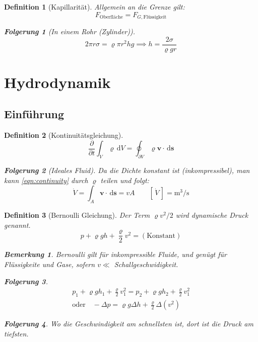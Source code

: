 \documentclass[a4paper, twocolumn]{article}
\numberwithin{equation}{section}
\theoremstyle{hsr-def}
\newtheorem{definition}{Definition}[section]
\theoremstyle{hsr-sub}
\newtheorem{result}{Folgerung}[definition]
\newtheorem{remark}{Bemerkung}[definition]
\newcommand{\dd}[1]{\ensuremath{\mathrm{d}#1}}
\newcommand{\di}[1]{\,\dd{#1}}
\newcommand{\pderiv}[2]{\ensuremath{\frac{\partial #1}{\partial #2}}}
\renewcommand{\vec}[1]{\ensuremath{\mathbf{#1}}}
\newcommand{\unitsof}[1]{\ensuremath{\left[\,#1\,\right]}}
\begin{document}
\begin{definition}[Kapillarit\"at]
Allgemein an die Grenze gilt:
\[
    F_\text{Oberfl\"ache} = F_{G,\text{Fl\"ussigkeit}}
\]
\begin{result}[In einem Rohr (Zylinder)]
\[
    2\pi r\sigma = \varrho\pi r^2 hg \implies  h = \frac{2\sigma}{\varrho g r}
\]
\end{result}
\end{definition}

\section{Hydrodynamik}
\subsection{Einf\"uhrung}
\begin{definition}[Kontinuit\"atsgleichung]
\begin{equation} \label{eqn:continuity}
    \pderiv{}{t}\int_V \varrho \di{V} 
    = \oint_{\partial V} \varrho \vec{v}\cdot\di{\vec{s}}
\end{equation}

\begin{result}[Ideales Fluid]
Da die Dichte konstant ist (inkompressibel), man kann \eqref{eqn:continuity} durch \(\varrho\) teilen und folgt:
\[
    \dot{V} = \int_A \vec{v}\cdot\di{\vec{s}} = vA
    \qquad
    \unitsof{\dot{V}} = \si{\cubic\metre\per\second}
\]
\end{result}

\end{definition}

\begin{definition}[Bernoulli Gleichung]
Der Term \(\varrho v^2 / 2\) wird \emph{dynamische Druck} genannt.
\[
    p + \varrho g h + \frac{\varrho}{2} v^2 = (\text{Konstant})
\]

\begin{remark}
Bernoulli gilt f\"ur inkompressible Fluide, und gen\"ugt f\"ur Fl\"ussigkeite und Gase, sofern \(v \ll \) Schallgeschwidigkeit.
\end{remark}

\begin{result}
\begin{gather*}
    p_1 + \varrho g h_1 + \frac{\varrho}{2} v_1^2
    =
    p_2 + \varrho g h_2 + \frac{\varrho}{2} v_1^2
    \\
    \text{oder}\quad -\Delta p = \varrho g \Delta h + \frac{\varrho}{2} \Delta \left( v^2 \right)
\end{gather*}
\end{result}

\begin{result}
Wo die Geschwindigkeit am schnellsten ist, dort ist die Druck am tiefsten.
\end{result}

\end{definition}
\end{document}

